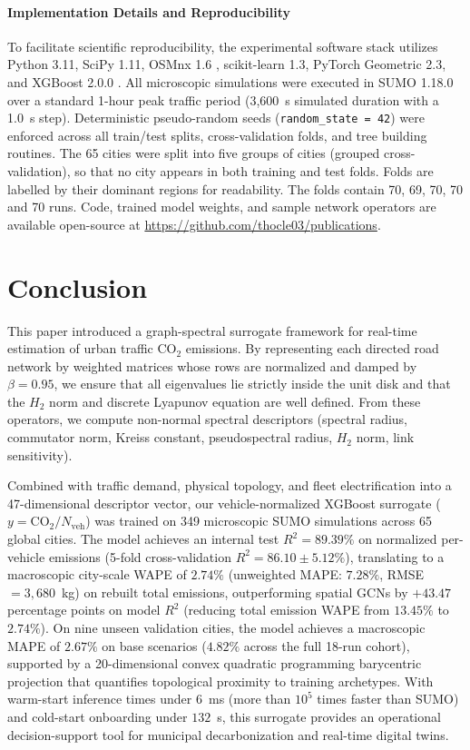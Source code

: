 \documentclass[journal]{IEEEtran}
\begin{document}
\paragraph*{Implementation Details and Reproducibility}
To facilitate scientific reproducibility, the experimental software stack utilizes Python 3.11, SciPy 1.11, OSMnx 1.6 \cite{Boeing2017}, scikit-learn 1.3, PyTorch Geometric 2.3, and XGBoost 2.0.0 \cite{Chen2016}. All microscopic simulations were executed in SUMO 1.18.0 \cite{Krajzewicz2012} over a standard 1-hour peak traffic period (3,600~s simulated duration with a 1.0~s step). Deterministic pseudo-random seeds (\texttt{random\_state = 42}) were enforced across all train/test splits, cross-validation folds, and tree building routines. The 65 cities were split into five groups of cities (grouped cross-validation), so that no city appears in both training and test folds. Folds are labelled by their dominant regions for readability. The folds contain 70, 69, 70, 70 and 70 runs. Code, trained model weights, and sample network operators are available open-source at \url{https://github.com/thocle03/publications}.

\section{Conclusion}

This paper introduced a graph-spectral surrogate framework for real-time estimation of urban traffic $\text{CO}_2$ emissions. By representing each directed road network by weighted matrices whose rows are normalized and damped by $\beta = 0.95$, we ensure that all eigenvalues lie strictly inside the unit disk and that the $H_2$ norm and discrete Lyapunov equation are well defined. From these operators, we compute non-normal spectral descriptors (spectral radius, commutator norm, Kreiss constant, pseudospectral radius, $H_2$ norm, link sensitivity).

Combined with traffic demand, physical topology, and fleet electrification into a 47-dimensional descriptor vector, our vehicle-normalized XGBoost surrogate ($y = \text{CO}_2 / N_{\text{veh}}$) was trained on 349 microscopic SUMO simulations across 65 global cities. The model achieves an internal test $R^2 = 89.39\%$ on normalized per-vehicle emissions (5-fold cross-validation $R^2 = 86.10 \pm 5.12\%$), translating to a macroscopic city-scale WAPE of $2.74\%$ (unweighted MAPE: $7.28\%$, RMSE $= 3,680$~kg) on rebuilt total emissions, outperforming spatial GCNs by $+43.47$ percentage points on model $R^2$ (reducing total emission WAPE from $13.45\%$ to $2.74\%$). On nine unseen validation cities, the model achieves a macroscopic MAPE of $2.67\%$ on base scenarios ($4.82\%$ across the full 18-run cohort), supported by a 20-dimensional convex quadratic programming barycentric projection \cite{Boyd2004} that quantifies topological proximity to training archetypes. With warm-start inference times under $6$~ms (more than $10^5$ times faster than SUMO) and cold-start onboarding under $132$~s, this surrogate provides an operational decision-support tool for municipal decarbonization and real-time digital twins.
\end{document}
